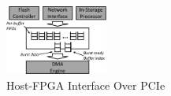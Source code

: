 \begin{figure}[ht!]
	\centering
	\includegraphics[width=0.3\textwidth]{figures/dmawrite-crop.pdf}
	\caption{Host-FPGA Interface Over PCIe}
	\label{fig:hostinterface}
\end{figure}

